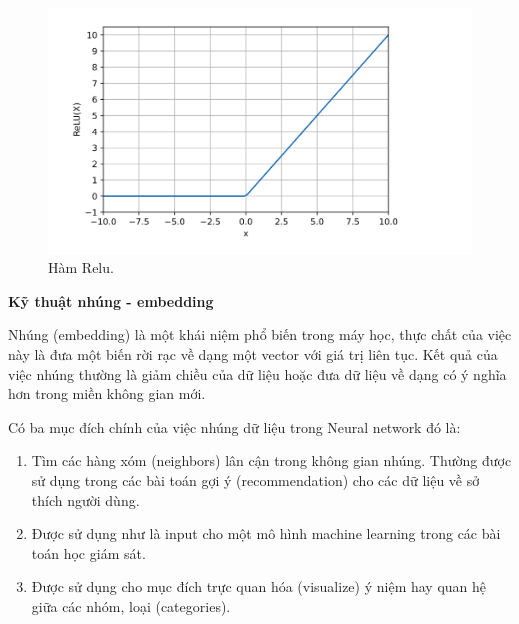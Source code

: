 \begin{itemize}
    \begin{figure}[t]
        \begin{center}
            \includegraphics[scale=0.2]{asset/image/relu.png}
            \caption{Hàm Relu. }
            \label{fig:relu}
        \end{center}
    \end{figure}
    

\end{itemize}

\textbf{Kỹ thuật nhúng -  embedding}

Nhúng (embedding) là một khái niệm phổ biến trong máy học, thực chất của việc này là đưa một biến rời rạc về dạng một vector với giá trị liên tục. Kết quả của việc nhúng thường là giảm chiều của dữ liệu hoặc đưa dữ liệu về dạng có ý nghĩa hơn trong miền không gian mới.


Có ba mục đích chính của việc nhúng dữ liệu trong Neural network đó là:
\begin{enumerate}
    \item Tìm các hàng xóm (neighbors) lân cận trong không gian nhúng. Thường được sử dụng trong các bài toán gợi ý (recommendation) cho các dữ liệu về sở thích người dùng.
    \item Được sử dụng như là input cho một mô hình machine learning trong các bài toán học giám sát.
    \item Được sử dụng cho mục đích trực quan hóa (visualize) ý niệm hay quan hệ giữa các nhóm, loại (categories).
\end{enumerate}

